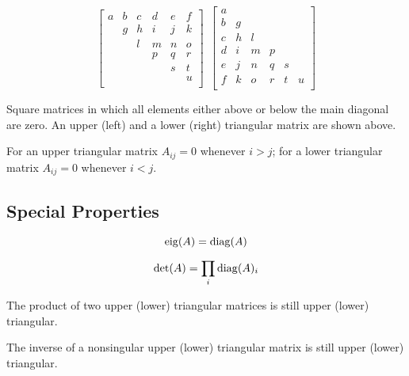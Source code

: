 \begin{equation}
\begin{bmatrix}
a & b & c & d & e & f \\
  & g & h & i & j & k \\
  &   & l & m & n & o \\
  &   &   & p & q & r \\
  &   &   &   & s & t \\
  &   &   &   &   & u \\
\end{bmatrix}
~
~
\begin{bmatrix}
a &   &   &   &   &   \\
b & g &   &   &   &   \\
c & h & l &   &   &   \\
d & i & m & p &   &   \\
e & j & n & q & s &   \\
f & k & o & r & t & u \\
\end{bmatrix}
\end{equation}

Square matrices in which all elements either above or below the main diagonal are zero. An upper (left) and a lower (right) triangular matrix are shown above.

For an upper triangular matrix $A_{ij}=0$ whenever $i>j$; for a lower triangular matrix $A_{ij}=0$ whenever $i<j$.


\subsection*{Special Properties}

\begin{equation}
\operatorname{eig}(A)=\operatorname{diag}(A) 
\end{equation}

\begin{equation}
\det(A)=\prod_i \operatorname{diag}(A)_i
\end{equation}

The product of two upper (lower) triangular matrices is still upper (lower) triangular.

The inverse of a nonsingular upper (lower) triangular matrix is still upper (lower) triangular.




